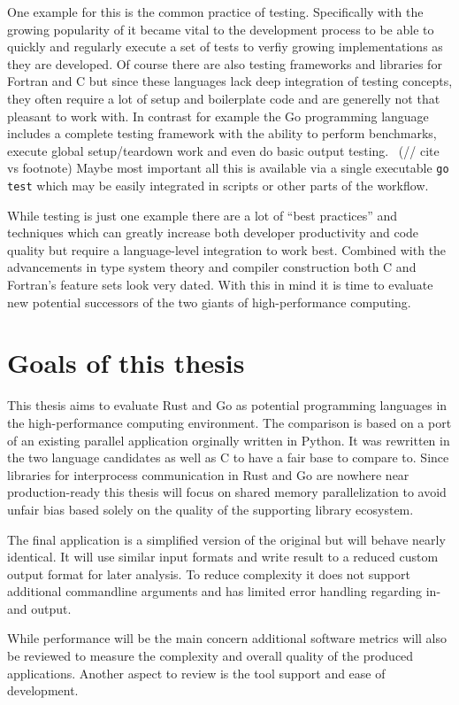 One example for this is the common practice of testing. Specifically with the growing popularity of  it became vital to the development process to be able to quickly and regularly execute a set of tests to verfiy growing implementations as they are developed. Of course there are also testing frameworks and libraries for Fortran and C but since these languages lack deep integration of testing concepts, they often require a lot of setup and boilerplate code and are generelly not that pleasant to work with. In contrast for example the Go programming language includes a complete testing framework with the ability to perform benchmarks, execute global setup/teardown work and even do basic output testing.~\cite{go_doc_testing} (// cite vs footnote) Maybe most important all this is available via a single executable \lstinline$go test$ which may be easily integrated in scripts or other parts of the workflow.

While testing is just one example there are a lot of ``best practices'' and techniques which can greatly increase both developer productivity and code quality but require a language-level integration to work best. Combined with the advancements in type system theory and compiler construction both C and Fortran's feature sets look very dated. With this in mind it is time to evaluate new potential successors of the two giants of high-performance computing.

\section{Goals of this thesis}
\label{sec:Introduction::Goals}

This thesis aims to evaluate Rust and Go as potential programming languages in the high-performance computing environment. The comparison is based on a port of an existing parallel application orginally written in Python. It was rewritten in the two language candidates as well as C to have a fair base to compare to. Since libraries for interprocess communication in Rust and Go are nowhere near production-ready this thesis will focus on shared memory parallelization to avoid unfair bias based solely on the quality of the supporting library ecosystem.

The final application is a simplified version of the original but will behave nearly identical. It will use similar input formats and write result to a reduced custom output format for later analysis. To reduce complexity it does not support additional commandline arguments and has limited error handling regarding in- and output.

While performance will be the main concern additional software metrics will also be reviewed to measure the complexity and overall quality of the produced applications. Another aspect to review is the tool support and ease of development.


